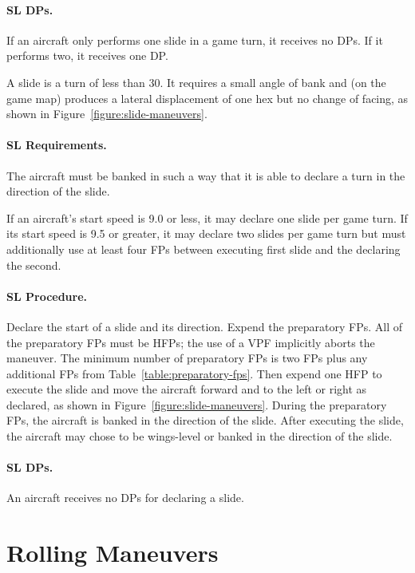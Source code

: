 {{\paragraph{SL DPs.} If an aircraft only performs one slide in a game turn, it receives no DPs. If it performs two, it receives one DP.

}{

A slide is a turn of less than 30{\deg}. It requires a small angle of bank and (on the game map) produces a lateral displacement of one hex but no change of facing, as shown in Figure~\ref{figure:slide-maneuvers}.

\paragraph{SL Requirements.} The aircraft must be banked in such a way that it is able to declare a turn in the direction of the slide.

If an aircraft's start speed is 9.0 or less, it may declare one slide per game turn. If its start speed is 9.5 or greater, it may declare two slides per game turn but must additionally use at least four FPs between executing first slide and the declaring the second.

\paragraph{SL Procedure.} Declare the start of a slide and its direction. Expend the preparatory FPs. All of the preparatory FPs must be HFPs; the use of a VPF implicitly aborts the maneuver. The minimum number of preparatory FPs is two FPs plus any additional FPs from Table~\ref{table:preparatory-fps}. Then expend one HFP to execute the slide and move the aircraft forward and to the left or right as declared, as shown in Figure~\ref{figure:slide-maneuvers}. During the preparatory FPs, the aircraft is banked in the direction of the slide. After executing the slide, the aircraft may chose to be wings-level or banked in the direction of the slide.

\paragraph{SL DPs.} An aircraft receives no DPs for declaring a slide.

}

}
\section{Rolling Maneuvers}
\label{rule:rolling-maneuvers}

